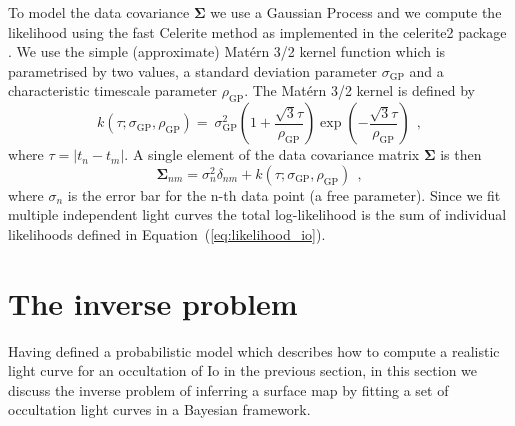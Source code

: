 \documentclass[12pt,dvipsnames]{report}
\newcommand{\hquad}{~~}
\begin{document}
To model the data covariance $\boldsymbol{\Sigma}$ we use a Gaussian Process and we 
compute the likelihood using the fast Celerite method \citep{2017AJ....154..220F} as 
implemented in the \textsf{celerite2} package 
\citep{2017AJ....154..220F,2018RNAAS...2...31F}.
We use the simple (approximate) Mat\'ern 3/2 kernel function which is parametrised 
by two values, a standard deviation parameter $\sigma_\mathrm{GP}$ and a characteristic 
timescale parameter $\rho_\mathrm{GP}$.
The Mat\'ern 3/2 kernel is defined by
\begin{equation}
    k(\tau;\sigma_\mathrm{GP},
    \rho_\mathrm{GP})=\
    \sigma_\mathrm{GP}^{2}\left(1+\frac{\sqrt{3} \tau}{\rho_\mathrm{GP}}\right) \exp \left(-\frac{\sqrt{3} \tau}{\rho_\mathrm{GP}}\right)
    \hquad,
\end{equation}
where $\tau=|t_n-t_m|$.
A single element of the data covariance matrix $\boldsymbol{\Sigma}$ is then 
\begin{equation}
    \boldsymbol{\Sigma}_{nm}=\sigma_n^2\delta_{nm} + k(\tau;\sigma_\mathrm{GP},\rho_\mathrm{GP})
    \hquad,
    \label{eq:data_covariance_element}
\end{equation}
where $\sigma_n$ is the error bar for the n-th data point (a free parameter).
Since we fit multiple independent light curves the total log-likelihood is the sum of 
individual likelihoods defined in Equation~(\ref{eq:likelihood_io}).

\section{The inverse problem}
\label{sec:io_inverse_problem}
Having defined a probabilistic model which describes how to compute a realistic light curve for an occultation of Io in the previous section, in this section we discuss the inverse problem of inferring a surface map by fitting a set of occultation light curves in a Bayesian framework.
\end{document}
